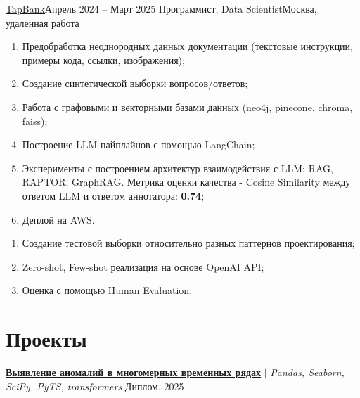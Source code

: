 \documentclass[letterpaper,11pt]{article}
\begin{document}
    \resumeSubheading
    {\href{link_to_company}{\underline{TapBank}}}{Апрель 2024 -- Март 2025}
    {Программист, Data Scientist}{Москва, удаленная работа}
    \resumeItemListStart
            \begin{enumerate}
                \item Предобработка неоднородных данных документации (текстовые инструкции, примеры кода, ссылки, изображения);
                \item Создание синтетической выборки вопросов/ответов;
                \item Работа с графовыми и векторными базами данных (neo4j, pinecone, chroma, faiss);
                \item Построение LLM-пайплайнов с помощью LangChain;
                \item Эксперименты с построением архитектур взаимодействия с LLM: RAG, RAPTOR, GraphRAG. Метрика оценки качества - Cosine Similarity между ответом LLM и ответом аннотатора: \textbf{0.74};
                \item Деплой на AWS.
            \end{enumerate}
            \begin{enumerate}
                \item Создание тестовой выборки относительно разных паттернов проектирования;
                \item Zero-shot, Few-shot реализация на основе OpenAI API;
                \item Оценка с помощью Human Evaluation.
            \end{enumerate}
    \resumeItemListEnd

\resumeSubHeadingListEnd

\section{Проекты}
\resumeSubHeadingListStart

    \resumeProjectHeading
    {\href{https://github.com/QQQiwi/diploma}{\textbf{Выявление аномалий в многомерных временных рядах}} $|$ \emph{Pandas, Seaborn, SciPy, PyTS, transformers}}    {Диплом, 2025}
    \resumeItemListStart
    \resumeItemListEnd
\end{document}
